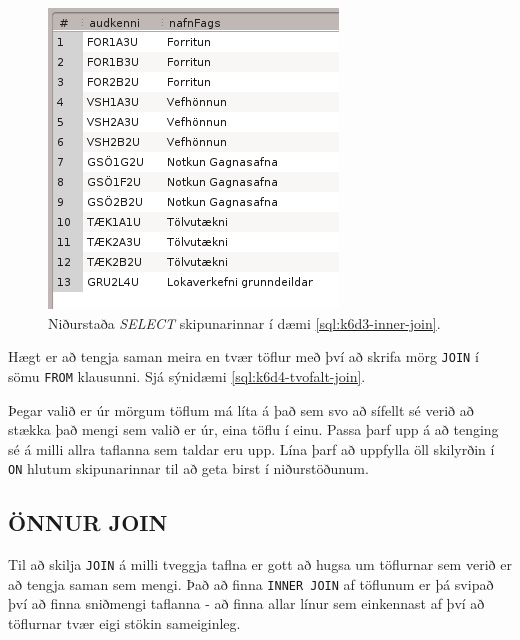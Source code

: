 \begin{example}
\caption[INNER JOIN]{\emph{SELECT} skipun sem velur úr töflunum \emph{Fog} og \emph{Afangar}. Niðurstöðurnar má sjá á mynd \ref{mynd:nidurstada-join}.}
\label{sql:k6d3-inner-join}
\centering
{}
\end{example}

\begin{figure}
\caption[INNER JOIN niðurstaða]{Niðurstaða \emph{SELECT} skipunarinnar í dæmi \ref{sql:k6d3-inner-join}. }
\label{mynd:nidurstada-join}
\centering
\includegraphics{myndir/workbench-nidurstada-join}
\end{figure}

Hægt er að tengja saman meira en tvær töflur með því að skrifa mörg \verb|JOIN| í sömu \verb|FROM| klausunni. Sjá sýnidæmi \ref{sql:k6d4-tvofalt-join}.

Þegar valið er úr mörgum töflum má líta á það sem svo að sífellt sé verið að stækka það mengi sem valið er úr, eina töflu í einu. Passa þarf upp á að tenging sé á milli allra taflanna sem taldar eru upp. Lína þarf að uppfylla öll skilyrðin í \verb|ON| hlutum skipunarinnar til að geta birst í niðurstöðunum.

\begin{example}
\caption[INNER JOIN]{\emph{SELECT} skipun sem velur nöfn hópa, hvaða áföngum hóparnir tilheyra og hver kennir þá, úr töflunum \emph{Hopar}, \emph{Afangar} og \emph{Starfsmenn}.}
\label{sql:k6d4-tvofalt-join}
\centering
{}
\end{example}

\subsection{ÖNNUR JOIN}
Til að skilja \verb|JOIN| á milli tveggja taflna er gott að hugsa um töflurnar sem verið er að tengja saman sem mengi. Það að finna \verb|INNER JOIN| af töflunum er þá svipað því að finna sniðmengi taflanna - að finna allar línur sem einkennast af því að töflurnar tvær eigi stökin sameiginleg.

